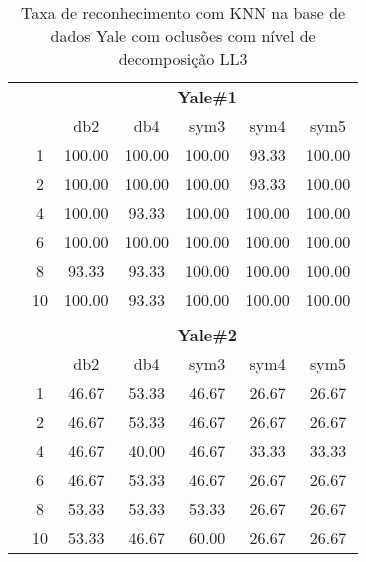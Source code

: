 \begin{table}[H]
	\centering
	\caption{Taxa de reconhecimento com KNN na base de dados Yale com oclusões com nível de decomposição LL3}
	\begin{tabular}{|c|c|c c c c c|}
\cline{3-7}
\multicolumn{2}{c|}{\multirow{2}{*}{}} & \multicolumn{5}{c|}{\textbf{Yale\#1}}  \\\cline{3-7}

\multicolumn{2}{c|}{}  & db2 & db4 & sym3 & sym4 & sym5 \\\hline


\multicolumn{1}{|c|}{ \multirow{6}{*}{\rotatebox[origin=c]{90}{\textbf{K-vizinhos}}} }

&1	&100.00	&100.00	&100.00	&	93.33	&100.00 \\\cline{2-7}
&2	&100.00	&100.00	&100.00	&	93.33	&100.00 \\\cline{2-7}
&4	&100.00	&93.33	&100.00	&	100.00	&100.00 \\\cline{2-7}
&6	&100.00	&100.00	&100.00	&	100.00	&100.00 \\\cline{2-7}
&8	&93.33	&93.33	&100.00	&	100.00	&100.00 \\\cline{2-7}
&10	&100.00	&93.33	&100.00	&	100.00	&100.00 \\\midrule


\multicolumn{7}{c}{}\\ 


\cline{3-7}
\multicolumn{2}{c|}{\multirow{2}{*}{}} & \multicolumn{5}{c|}{\textbf{Yale\#2}}  \\\cline{3-7}

\multicolumn{2}{c|}{}  & db2 & db4 & sym3 & sym4 & sym5 \\\hline

\multicolumn{1}{|c|}{ \multirow{6}{*}{\rotatebox[origin=c]{90}{\textbf{K-vizinhos}}} }

&1	&46.67	&53.33	&46.67	&26.67	&26.67 \\\cline{2-7}
&2	&46.67	&53.33	&46.67	&26.67	&26.67 \\\cline{2-7}
&4	&46.67	&40.00	&46.67	&33.33	&33.33 \\\cline{2-7}
&6	&46.67	&53.33	&46.67	&26.67	&26.67 \\\cline{2-7}
&8	&53.33	&53.33	&53.33	&26.67	&26.67 \\\cline{2-7}
&10	&53.33	&46.67	&60.00	&26.67	&26.67 \\\midrule
\end{tabular}
\end{table}



